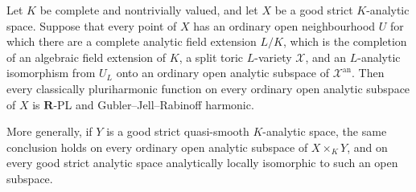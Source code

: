 
\begin{corollary}
\label{cor:p061-algebraic-split-analytic-toric-forms}
Let \(K\) be complete and nontrivially valued, and let \(X\) be a good
strict \(K\)-analytic space.  Suppose that every point of \(X\) has an
ordinary open neighbourhood \(U\) for which there are a complete analytic
field extension \(L/K\), which is the completion of an algebraic field
extension of \(K\), a split toric \(L\)-variety \(\mathcal X\), and an
\(L\)-analytic isomorphism from \(U_L\) onto an ordinary open analytic
subspace of \(\mathcal X^{\mathrm{an}}\).  Then every classically
pluriharmonic function on every ordinary open analytic subspace of \(X\) is
\(\mathbf R\)-PL and Gubler--Jell--Rabinoff harmonic.

More generally, if \(Y\) is a good strict quasi-smooth \(K\)-analytic
space, the same conclusion holds on every ordinary open analytic subspace of
\(X\times_KY\), and on every good strict analytic space analytically
locally isomorphic to such an open subspace.
\end{corollary}
